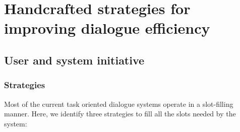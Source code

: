 \chapter{Handcrafted strategies for improving dialogue efficiency}
\label{ch:baseline}

\section{User and system initiative}
	\subsection{Strategies}
    \label{subsec:strategies}
      Most of the current task oriented dialogue systems operate in a slot-filling manner. Here, we identify three strategies to fill all the slots needed by the system:

